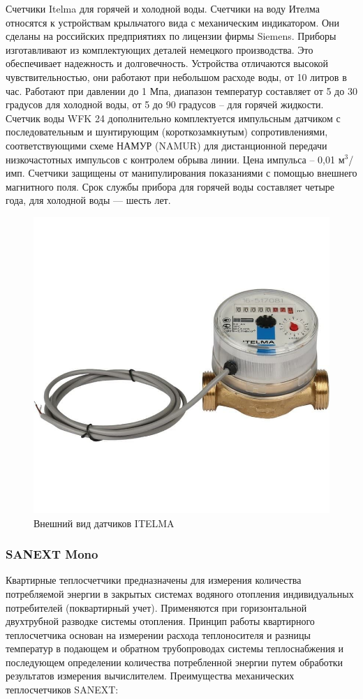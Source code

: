 Счетчики Itelma для горячей и холодной воды.
Счетчики на воду Ителма относятся к устройствам крыльчатого вида с механическим индикатором. Они сделаны на российских предприятиях по лицензии фирмы Siemens. Приборы изготавливают из комплектующих деталей немецкого производства. Это обеспечивает надежность и долговечность. \cite{itelma}
Устройства отличаются высокой чувствительностью, они работают при небольшом расходе воды, от 10 литров в час. Работают при давлении до 1 Мпа, диапазон температур составляет от 5 до 30 градусов для холодной воды, от 5 до 90 градусов – для горячей жидкости.
Счетчик воды WFK 24 дополнительно комплектуется импульсным датчиком с последовательным и шунтирующим (короткозамкнутым) сопротивлениями, соответствующими схеме НАМУР (NAMUR) для дистанционной передачи низкочастотных импульсов с контролем обрыва линии. \cite{saures}
Цена импульса – 0,01 м$^{3}$/имп. 
Счетчики защищены от манипулирования показаниями с помощью внешнего магнитного поля. Срок службы прибора для горячей воды составляет четыре года, для холодной воды --- шесть лет.

\begin{figure}[H]
	\centering
	\includegraphics[width=0.5\linewidth]{pics/itelma}
	\caption{Внешний вид датчиков ITELMA}
	\label{fig:itelma}
\end{figure}

\subsubsection{SANEXT Mono}

Квартирные теплосчетчики предназначены для измерения количества потребляемой энергии в закрытых системах водяного отопления индивидуальных потребителей (поквартирный учет). Применяются при горизонтальной двухтрубной разводке системы отопления. 
Принцип работы квартирного теплосчетчика основан на измерении расхода теплоносителя и разницы температур в подающем и обратном трубопроводах системы теплоснабжения и последующем определении количества потребленной энергии путем обработки результатов измерения вычислителем. \cite{sanext}
Преимущества механических теплосчетчиков SANEXT:


